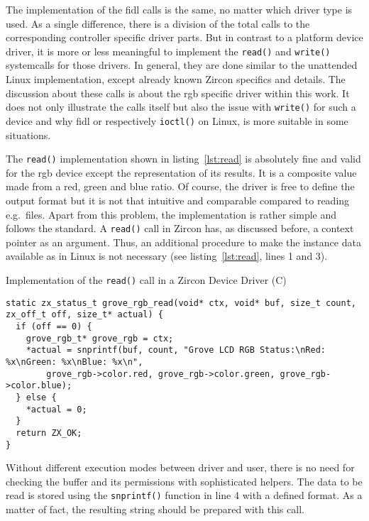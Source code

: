 %
The implementation of the \ac{fidl} calls is the same, no matter which driver type is used.
As a single difference, there is a division of the total calls to the corresponding controller specific driver parts.
But in contrast to a platform device driver, it is more or less meaningful to implement the \texttt{read()} and \texttt{write()} systemcalls for those drivers.
In general, they are done similar to the unattended Linux implementation, except already known Zircon specifics and details.
The discussion about these calls is about the \ac{rgb} specific driver within this work.
It does not only illustrate the calls itself but also the issue with \texttt{write()} for such a device and why \ac{fidl} or respectively \texttt{ioctl()} on Linux, is more suitable in some situations.

The \texttt{read()} implementation shown in listing~\ref{lst:read} is absolutely fine and valid for the \ac{rgb} device except the representation of its results.
It is a composite value made from a red, green and blue ratio.
Of course, the driver is free to define the output format but it is not that intuitive and comparable compared to reading e.g.\ files.
Apart from this problem, the implementation is rather simple and follows the standard.
A \texttt{read()} call in Zircon has, as discussed before, a context pointer as an argument.
Thus, an additional procedure to make the instance data available as in Linux is not necessary (see listing~\ref{lst:read}, lines 1 and 3).
%
\begin{listing} [H]
    \caption{Implementation of the \texttt{read()} call in a Zircon Device Driver (C)}
\label{lst:read}
\begin{verbatim}
static zx_status_t grove_rgb_read(void* ctx, void* buf, size_t count, zx_off_t off, size_t* actual) {
  if (off == 0) {
    grove_rgb_t* grove_rgb = ctx;
    *actual = snprintf(buf, count, "Grove LCD RGB Status:\nRed: %x\nGreen: %x\nBlue: %x\n",
        grove_rgb->color.red, grove_rgb->color.green, grove_rgb->color.blue);
  } else {
    *actual = 0;
  }
  return ZX_OK;
}
\end{verbatim}
\end{listing}
%
Without different execution modes between driver and user, there is no need for checking the buffer and its permissions with sophisticated helpers.
The data to be read is stored using the \texttt{snprintf()} function in line 4 with a defined format.
As a matter of fact, the resulting string should be prepared with this call.

